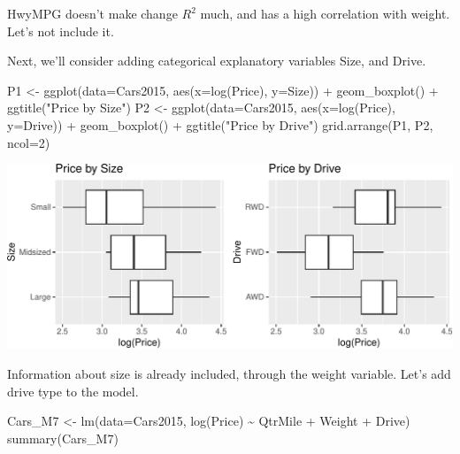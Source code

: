 \documentclass[
  letterpaper,
  DIV=11,
  numbers=noendperiod]{scrreprt}
\newenvironment{Shaded}{\begin{snugshade}}{\end{snugshade}}
\newcommand{\AttributeTok}[1]{\textcolor[rgb]{0.40,0.45,0.13}{#1}}
\newcommand{\DecValTok}[1]{\textcolor[rgb]{0.68,0.00,0.00}{#1}}
\newcommand{\FunctionTok}[1]{\textcolor[rgb]{0.28,0.35,0.67}{#1}}
\newcommand{\NormalTok}[1]{\textcolor[rgb]{0.00,0.23,0.31}{#1}}
\newcommand{\OtherTok}[1]{\textcolor[rgb]{0.00,0.23,0.31}{#1}}
\newcommand{\SpecialCharTok}[1]{\textcolor[rgb]{0.37,0.37,0.37}{#1}}
\newcommand{\StringTok}[1]{\textcolor[rgb]{0.13,0.47,0.30}{#1}}
\begin{document}
HwyMPG doesn't make change \(R^2\) much, and has a high correlation with
weight. Let's not include it.

Next, we'll consider adding categorical explanatory variables Size, and
Drive.

\begin{Shaded}
\begin{Highlighting}[]
\NormalTok{P1 }\OtherTok{\textless{}{-}} \FunctionTok{ggplot}\NormalTok{(}\AttributeTok{data=}\NormalTok{Cars2015, }\FunctionTok{aes}\NormalTok{(}\AttributeTok{x=}\FunctionTok{log}\NormalTok{(Price), }\AttributeTok{y=}\NormalTok{Size)) }\SpecialCharTok{+} \FunctionTok{geom\_boxplot}\NormalTok{() }\SpecialCharTok{+} \FunctionTok{ggtitle}\NormalTok{(}\StringTok{"Price by Size"}\NormalTok{)}
\NormalTok{P2 }\OtherTok{\textless{}{-}} \FunctionTok{ggplot}\NormalTok{(}\AttributeTok{data=}\NormalTok{Cars2015, }\FunctionTok{aes}\NormalTok{(}\AttributeTok{x=}\FunctionTok{log}\NormalTok{(Price), }\AttributeTok{y=}\NormalTok{Drive)) }\SpecialCharTok{+} \FunctionTok{geom\_boxplot}\NormalTok{() }\SpecialCharTok{+} \FunctionTok{ggtitle}\NormalTok{(}\StringTok{"Price by Drive"}\NormalTok{)}
\FunctionTok{grid.arrange}\NormalTok{(P1, P2, }\AttributeTok{ncol=}\DecValTok{2}\NormalTok{)}
\end{Highlighting}
\end{Shaded}

\includegraphics{Ch5_files/figure-pdf/unnamed-chunk-69-1.pdf}

Information about size is already included, through the weight variable.
Let's add drive type to the model.

\begin{Shaded}
\begin{Highlighting}[]
\NormalTok{Cars\_M7 }\OtherTok{\textless{}{-}} \FunctionTok{lm}\NormalTok{(}\AttributeTok{data=}\NormalTok{Cars2015, }\FunctionTok{log}\NormalTok{(Price) }\SpecialCharTok{\textasciitilde{}}\NormalTok{ QtrMile }\SpecialCharTok{+}\NormalTok{ Weight }\SpecialCharTok{+}\NormalTok{ Drive)}
\FunctionTok{summary}\NormalTok{(Cars\_M7)}
\end{Highlighting}
\end{Shaded}
\end{document}
